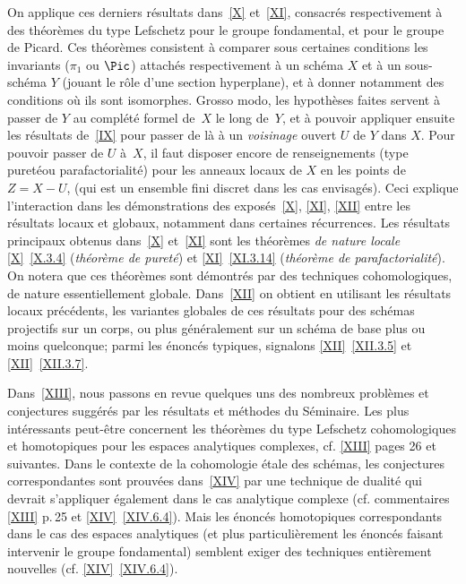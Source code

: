 On applique ces derniers r\'esultats dans~\ref{X} et~\ref{XI}, consacr\'es respectivement \`a des th\'eor\`emes du type Lefschetz pour le groupe fondamental, et pour le groupe de \hbox{Picard}. Ces th\'eor\`emes consistent \`a comparer sous certaines conditions les invariants ($\pi_1$ ou $\Pic$) attach\'es respectivement \`a un sch\'ema $X$ et \`a un sous-sch\'ema $Y$ (jouant le r\^{o}le d'une section hyperplane), et \`a donner notamment des conditions o\`u ils sont isomorphes. Grosso modo, les hypoth\`eses faites servent \`a passer de $Y$ au compl\'et\'e formel de~$X$ le long de~$Y$, et \`a pouvoir appliquer ensuite les r\'esultats de~\ref{IX} pour passer de l\`a \`a un \emph{voisinage} ouvert $U$ de $Y$ dans $X$. Pour pouvoir passer de $U$ \`a~$X$, il faut disposer encore de renseignements (type \og puret\'e\fg ou \og parafactorialit\'e{\fg}) pour les anneaux locaux de $X$ en les points de $Z=X-U$, (qui est un ensemble fini discret dans les cas envisag\'es). Ceci explique l'interaction dans les d\'emonstrations des expos\'es~\ref{X}, \ref{XI}, \ref{XII} entre les r\'esultats locaux et globaux, notamment dans certaines r\'ecurrences. Les r\'esultats principaux obtenus dans~\ref{X} et~\ref{XI} sont les th\'eor\`emes \emph{de nature locale} \ref{X}~\ref{X.3.4} (\emph{théorème de pureté}) et \ref{XI}~\ref{XI.3.14} (\emph{théorème de parafactorialité}). On notera que ces th\'eor\`emes sont d\'emontr\'es par des techniques cohomologiques, de nature essentiellement globale. Dans~\ref{XII} on obtient en utilisant les r\'esultats locaux pr\'ec\'edents, les variantes globales de ces r\'esultats pour des sch\'emas projectifs sur un corps, ou plus g\'en\'eralement sur un sch\'ema de base plus ou moins quelconque; parmi les \'enonc\'es typiques, signalons \ref{XII}~\ref{XII.3.5} et \ref{XII}~\ref{XII.3.7}.

Dans~\ref{XIII}, nous passons en revue quelques uns des nombreux probl\`emes et conjectures sugg\'er\'es par les r\'esultats et m\'ethodes du S\'eminaire. Les plus int\'eressants peut-\^etre concernent les th\'eor\`emes du type Lefschetz cohomologiques et homotopiques pour les espaces analytiques complexes, cf. \ref{XIII} pages 26 et suivantes. Dans le contexte de la cohomologie \'etale des sch\'emas, les conjectures correspondantes sont prouv\'ees dans~\ref{XIV} par une technique de dualit\'e qui devrait s'appliquer \'egalement dans le cas analytique complexe (cf. commentaires \ref{XIII} p.\,25 et \ref{XIV}~\ref{XIV.6.4}). Mais les \'enonc\'es homotopiques correspondants dans le cas des espaces analytiques (et plus particuli\`erement les \'enonc\'es faisant intervenir le groupe fondamental) semblent exiger des techniques enti\`erement nouvelles (cf. \ref{XIV}~\ref{XIV.6.4}).

